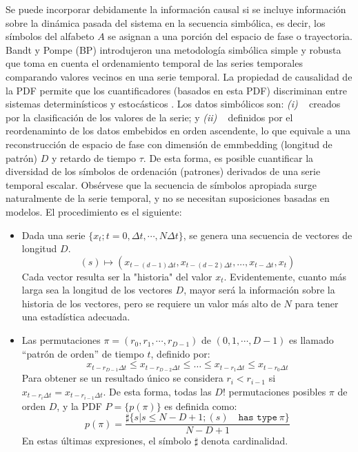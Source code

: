 Se puede incorporar debidamente la información causal si se incluye información sobre la dinámica pasada del sistema en la secuencia simbólica, es decir, los símbolos del alfabeto $A$ se asignan a una porción del espacio de fase o trayectoria.
Bandt y Pompe (BP) \cite{Bandt2002} introdujeron una metodología simbólica simple y robusta que toma en cuenta el ordenamiento temporal de las series temporales comparando valores vecinos en una serie temporal.
La propiedad de causalidad de la PDF permite que los cuantificadores (basados en esta PDF) discriminan entre sistemas determinísticos y estocásticos \cite{Rosso2007B}.
Los datos simbólicos son:
{\it (i) \/} ~ creados por la clasificación de los valores de la serie; y
{\it (ii) \/} ~ definidos por el reordenaminto de los datos embebidos en orden ascendente, lo que equivale a una reconstrucción de espacio de fase con dimensión de emmbedding (longitud de patrón) $D$ y retardo de tiempo $\tau$.
De esta forma, es posible cuantificar la diversidad de los símbolos de ordenación (patrones) derivados de una serie temporal escalar.
Obsérvese que la secuencia de símbolos apropiada surge naturalmente de la serie temporal, y no se necesitan suposiciones basadas en modelos.
El procedimiento es el siguiente:
\begin{itemize}
	\item Dada una serie $\{x_t; t=0, \Delta t, \cdots,N\Delta t \}$, se genera una secuencia de vectores de longitud $D$.
	\begin{equation}
	(s)\longmapsto\left(x_{t-(d-1)\Delta t},x_{t-(d-2)\Delta t},\dots,x_{t-\Delta t},x_{t}\right) 
	\label{eq:vectores}
	\end{equation}
	Cada vector resulta ser la "historia" del valor $x_t$. Evidentemente, cuanto más larga sea la longitud de los vectores $D$, mayor será la información sobre la historia de los vectores, pero se requiere un valor más alto de $N$ para tener una estadística adecuada.
	\item Las permutaciones $\pi=(r_0, r_1, \cdots, r_{D-1})$ de $(0, 1, \cdots, D-1)$ es llamado ``patrón de orden'' de tiempo $t$, definido por:
	\begin{equation}
	\label{eq:permuta}
	x_{t-r_{D-1}\Delta t}\le x_{t-r_{D-2}\Delta t}\le\dots\le x_{t-r_{1}\Delta t}\le x_{t-r_0\Delta t}
	\end{equation}
	Para obtener se un resultado único se considera $r_i<r_{i-1}$ si $x_{t-r_{i}\Delta t}=x_{t-r_{i-1}\Delta t}$.
	De esta forma, todas las $D!$ permutaciones posibles $\pi$ de orden $D$, y la PDF $P=\{p(\pi)\}$ es definida como:
	\begin{equation}
	\label{eq:frequ}
	p(\pi)=\frac{\sharp \{s|s\leq N-D+1; (s) \quad \texttt{has type}~\pi\}}{N-D+1}
	\end{equation}
	En estas últimas expresiones, el símbolo $\sharp$ denota cardinalidad.
\end{itemize}

